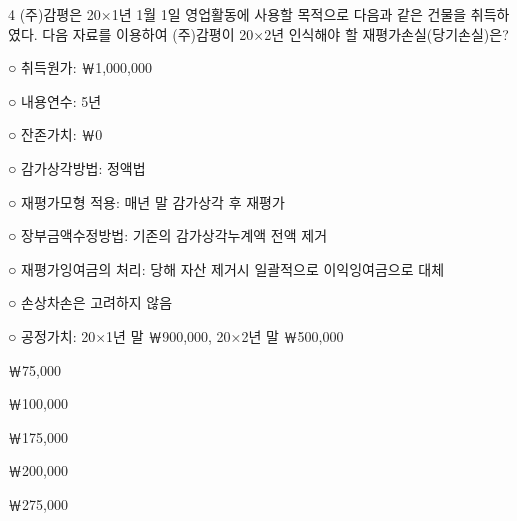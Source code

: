 \begin{question}{4}
(주)감평은 20×1년 1월 1일 영업활동에 사용할 목적으로 다음과 같은 건물을 취득하였다. 다음 자료를 이용하여 (주)감평이 20×2년 인식해야 할 재평가손실(당기손실)은?
\begin{framedtext}
○ 취득원가: ￦1,000,000 \par
○ 내용연수: 5년 \par
○ 잔존가치: ￦0 \par
○ 감가상각방법: 정액법 \par
○ 재평가모형 적용: 매년 말 감가상각 후 재평가 \par
○ 장부금액수정방법: 기존의 감가상각누계액 전액 제거 \par
○ 재평가잉여금의 처리: 당해 자산 제거시 일괄적으로 이익잉여금으로 대체 \par
○ 손상차손은 고려하지 않음 \par
○ 공정가치: 20×1년 말 ￦900,000, 20×2년 말 ￦500,000 \par
\end{framedtext}
\begin{choices}
  \item ￦75,000
  \item ￦100,000
  \item ￦175,000
  \item ￦200,000
  \item ￦275,000
\end{choices}
\end{question}
